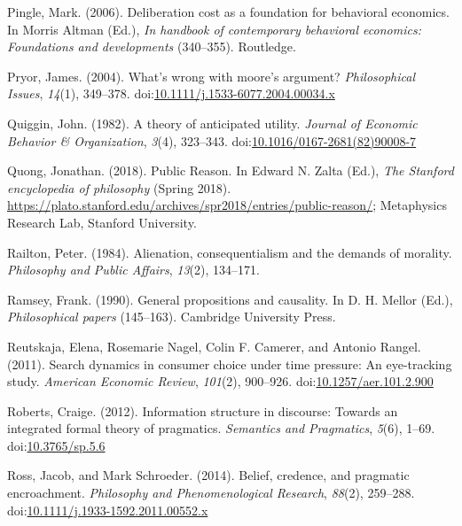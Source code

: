 \documentclass[
  10pt,
  letterpaper,
  twoside]{scrbook}
\newlength{\cslhangindent}
\newenvironment{CSLReferences}[2] %
 {\begin{list}{}{%
  \setlength{\itemindent}{0pt}
  \setlength{\leftmargin}{0pt}
  \setlength{\parsep}{0pt}
  \ifodd #1
   \setlength{\leftmargin}{\cslhangindent}
   \setlength{\itemindent}{-1\cslhangindent}
  \fi
  \setlength{\itemsep}{#2\baselineskip}}}
 {\end{list}}
\begin{document}
\begin{CSLReferences}{1}{0}
Pingle, Mark. (2006). Deliberation cost as a foundation for behavioral
economics. In Morris Altman (Ed.), \emph{In handbook of contemporary
behavioral economics: Foundations and developments} (340--355).
Routledge.

Pryor, James. (2004). What's wrong with moore's argument?
\emph{Philosophical Issues}, \emph{14}(1), 349--378.
doi:\href{https://doi.org/10.1111/j.1533-6077.2004.00034.x}{10.1111/j.1533-6077.2004.00034.x}

Quiggin, John. (1982). A theory of anticipated utility. \emph{Journal of
Economic Behavior \& Organization}, \emph{3}(4), 323--343.
doi:\href{https://doi.org/10.1016/0167-2681(82)90008-7}{10.1016/0167-2681(82)90008-7}

Quong, Jonathan. (2018). {Public Reason}. In Edward N. Zalta (Ed.),
\emph{The {Stanford} encyclopedia of philosophy} ({S}pring 2018).
\url{https://plato.stanford.edu/archives/spr2018/entries/public-reason/};
Metaphysics Research Lab, Stanford University.

Railton, Peter. (1984). Alienation, consequentialism and the demands of
morality. \emph{Philosophy and Public Affairs}, \emph{13}(2), 134--171.

Ramsey, Frank. (1990). General propositions and causality. In D. H.
Mellor (Ed.), \emph{Philosophical papers} (145--163). Cambridge
University Press.

Reutskaja, Elena, Rosemarie Nagel, Colin F. Camerer, and Antonio Rangel.
(2011). Search dynamics in consumer choice under time pressure: An
eye-tracking study. \emph{American Economic Review}, \emph{101}(2),
900--926.
doi:\href{https://doi.org/10.1257/aer.101.2.900}{10.1257/aer.101.2.900}

Roberts, Craige. (2012). Information structure in discourse: Towards an
integrated formal theory of pragmatics. \emph{Semantics and Pragmatics},
\emph{5}(6), 1--69.
doi:\href{https://doi.org/10.3765/sp.5.6}{10.3765/sp.5.6}

Ross, Jacob, and Mark Schroeder. (2014). Belief, credence, and pragmatic
encroachment. \emph{Philosophy and Phenomenological Research},
\emph{88}(2), 259--288.
doi:\href{https://doi.org/10.1111/j.1933-1592.2011.00552.x}{10.1111/j.1933-1592.2011.00552.x}


\end{CSLReferences}
\end{document}
